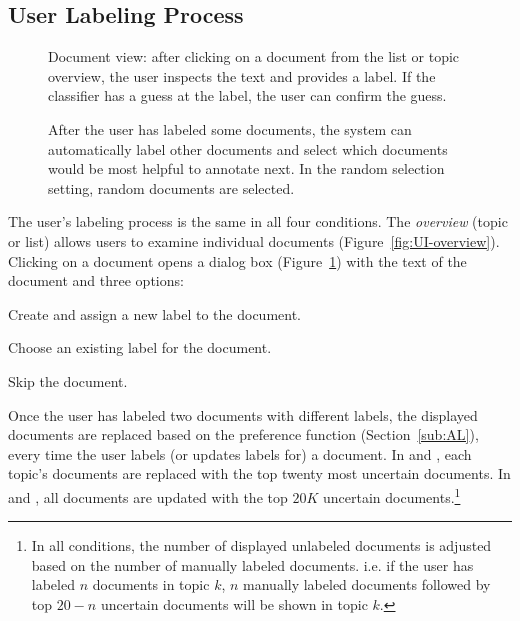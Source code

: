 \subsection{User Labeling Process}\label{sub:interaction}

     \begin{figure}[t!]%
        \centering
  		\caption{Document view: after clicking on a document from the list or topic overview, the user inspects the text and provides a label.  If the classifier has a guess at the label, the user can confirm the guess.}
  		\label{fig:UI-label}
        \end{figure}%
      \begin{figure}[t!]%
        \centering
      	\caption{After the user has labeled some documents, the system can automatically label other documents and select which documents would be most helpful to annotate next.  In the random selection setting, random documents are selected.}
 		 \label{fig:UI-highlight}
       \end{figure}%



The user's labeling process is the same in all four conditions. The
\emph{overview} (topic or list) allows users to examine individual
documents (Figure~\ref{fig:UI-overview}). Clicking on a document opens a dialog box
(Figure~\ref{fig:UI-label}) with the text of the document and three
options:
\begin{enumerate*}
  \item Create and assign a new label to the document.
  \item Choose an existing label for the document.
  \item Skip the document.
\end{enumerate*}








Once the user has labeled two documents with different labels, the displayed
documents are replaced based on the preference function (Section~\ref{sub:AL}),
every time the user labels (or updates labels for) a document. In  and
, each topic's documents are replaced with the top twenty most uncertain
documents. In  and , all documents are updated with the top
$20K$ uncertain documents.\footnote{In all conditions, the number of displayed unlabeled documents is adjusted based on the number of manually labeled documents. i.e. if the user has labeled $n$ documents in topic $k$, $n$ manually labeled documents followed by top $20-n$ uncertain documents will be shown in topic $k$.}

